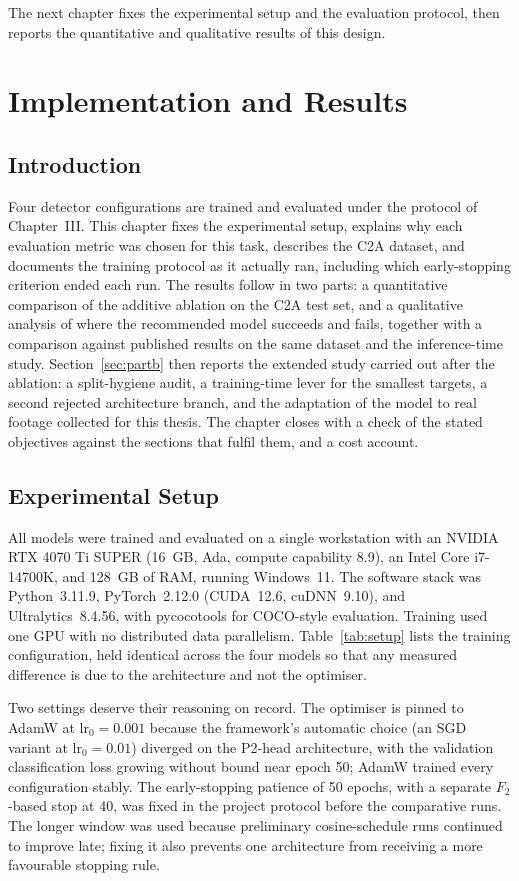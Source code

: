 \documentclass[12pt,a4paper,oneside]{report}
\begin{document}
The next chapter fixes the experimental setup and the evaluation protocol, then
reports the quantitative and qualitative results of this design.
 \newpage 
 \newpage \chapter{Implementation and Results}

\section{Introduction}
Four detector configurations are trained and evaluated under the protocol of
Chapter~III. This chapter fixes the experimental
setup, explains why each evaluation metric was chosen for this task, describes
the C2A dataset, and documents the training protocol as it actually ran,
including which early-stopping criterion ended each run. The results follow in
two parts: a quantitative comparison of the additive ablation on the C2A test
set, and a qualitative analysis of where the recommended model succeeds and
fails, together with a comparison against published results on the same
dataset and the inference-time study. Section~\ref{sec:partb} then reports the
extended study carried out after the ablation: a split-hygiene audit, a
training-time lever for the smallest targets, a second rejected architecture
branch, and the adaptation of the model to real footage collected for this
thesis. The chapter closes with a check of the stated objectives against the
sections that fulfil them, and a cost account.

\section{Experimental Setup}
\label{sec:setup}
All models were trained and evaluated on a single workstation with an NVIDIA
RTX 4070 Ti SUPER (16~GB, Ada, compute capability 8.9), an Intel Core
i7-14700K, and 128~GB of RAM, running Windows~11. The software stack was
Python~3.11.9, PyTorch~2.12.0 (CUDA~12.6, cuDNN~9.10), and Ultralytics~8.4.56,
with pycocotools for COCO-style evaluation. Training used one GPU with no
distributed data parallelism. Table~\ref{tab:setup} lists the training
configuration, held identical across the four models so that any measured
difference is due to the architecture and not the optimiser.

Two settings deserve their reasoning on record. The optimiser is pinned to
AdamW at $\text{lr}_0 = 0.001$ because the framework's automatic choice
(an SGD variant at $\text{lr}_0 = 0.01$) diverged on the P2-head
architecture, with the validation classification loss growing without bound
near epoch 50; AdamW trained every configuration stably. The early-stopping
patience of 50 epochs, with a separate $F_2$-based stop at 40, was fixed in
the project protocol before the comparative runs. The longer window was used
because preliminary cosine-schedule runs continued to improve late; fixing it
also prevents one architecture from receiving a more favourable stopping rule.
\end{document}
